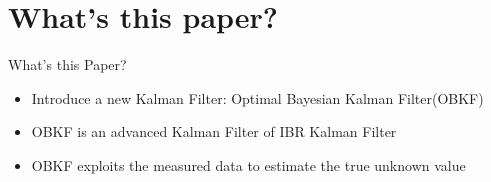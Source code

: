 \section{What's this paper?}
\begin{frame}
    \tableofcontents[currentsection]
\end{frame}

\begin{frame}{What's this Paper?}
\begin{itemize}
    \item Introduce a new Kalman Filter: Optimal Bayesian Kalman Filter(OBKF)\cite{Dehghannasiri2018}
    \item OBKF is an advanced Kalman Filter of IBR Kalman Filter\cite{Dehghannasiri2017}
    \item OBKF exploits the measured data to estimate the true unknown value
\end{itemize}
\end{frame}